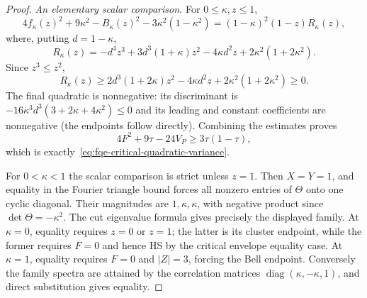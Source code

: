 \begin{proof}
\emph{An elementary scalar comparison.}
For $0\le\kappa,z\le1$,
\[
 4f_\kappa(z)^2+9\kappa^2-B_\kappa(z)^2
       -3\kappa^2(1-\kappa^2)
   =(1-\kappa)^2(1-z)R_\kappa(z),
\]
where, putting $d=1-\kappa$,
\[
 R_\kappa(z)=-d^4z^3+3d^3(1+\kappa)z^2
                    -4\kappa d^2z+2\kappa^2(1+2\kappa^2).
\]
Since $z^3\le z^2$,
\[
 R_\kappa(z)\ge
 2d^3(1+2\kappa)z^2-4\kappa d^2z+2\kappa^2(1+2\kappa^2)\ge0.
\]
The final quadratic is nonnegative: its discriminant is
$-16\kappa^3d^3(3+2\kappa+4\kappa^2)\le0$ and its leading and constant
coefficients are nonnegative (the endpoints follow directly).
Combining the estimates proves
\[
 4F^2+9\tau-24V_P\ge3\tau(1-\tau),
\]
which is exactly~\eqref{eq:fqe-critical-quadratic-variance}.

For $0<\kappa<1$ the scalar comparison is strict unless $z=1$.
Then $X=Y=1$, and equality in the Fourier triangle bound forces all nonzero
entries of $\Theta$ onto one cyclic diagonal. Their magnitudes are
$1,\kappa,\kappa$, with negative product since $\det\Theta=-\kappa^2$.
The cut eigenvalue formula gives precisely the displayed family.
At $\kappa=0$, equality requires $z=0$ or $z=1$; the latter is its cluster
endpoint, while the former requires $F=0$ and hence HS by the critical
envelope equality case. At $\kappa=1$, equality requires $F=0$ and
$|Z|=3$, forcing the Bell endpoint.
Conversely the family spectra are attained by the correlation matrices
$\operatorname{diag}(\kappa,-\kappa,1)$, and direct substitution gives equality.
\end{proof}
